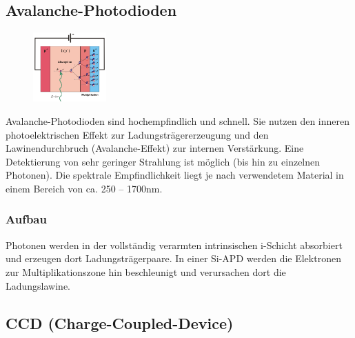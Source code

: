 \subsection{Avalanche-Photodioden}
\begin{figure}
    \centering
    \includegraphics[width=0.25\textwidth]{images/apd}
\end{figure}
Avalanche-Photodioden sind hochempfindlich und schnell. Sie nutzen den inneren photoelektrischen Effekt zur Ladungsträgererzeugung und den Lawinendurchbruch (Avalanche-Effekt) zur internen Verstärkung. Eine Detektierung von sehr geringer Strahlung ist möglich (bis hin zu einzelnen Photonen). Die spektrale Empfindlichkeit liegt je nach verwendetem Material in einem Bereich von ca. 250 – 1700nm.
\subsubsection{Aufbau}
Photonen werden in der vollständig verarmten intrinsischen i-Schicht absorbiert und erzeugen dort Ladungsträgerpaare. In einer Si-APD werden die Elektronen zur Multiplikationszone hin beschleunigt und verursachen dort die Ladungslawine.

\subsection{CCD (Charge-Coupled-Device)}
